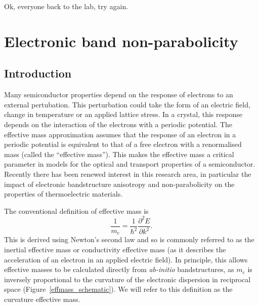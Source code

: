 \begin{savequote}[8cm]
Ok, everyone back to the lab, try again.
\end{savequote}

\chapter{\label{ch:4-effmass}Electronic band non-parabolicity}

\section{Introduction}

Many semiconductor properties depend on the response of electrons to an external pertubation.
This perturbation could take the form of an electric field, change in temperature or an applied lattice stress.  %
In a crystal, this response depends on the interaction of the electrons with a periodic potential. 
The effective mass approximation assumes that the response of an electron in a periodic potential is equivalent to that of a free electron with a renormalised mass (called the ``effective mass'').
This makes the effective mass a critical parameter in models for the optical and transport properties of a semiconductor.
Recently there has been renewed interest in this research area, in particular the impact of electronic bandstructure anisotropy and non-parabolicity on the properties of thermoelectric materials.\autocite{Gibbs2017,Mecholsky2014}

The conventional definition of effective mass is
\begin{equation} \label{curvature}
\frac{1}{m_\text{c}}= \frac{1}{\hbar^2}\frac{\partial^2E}{\partial k^2}.
\end{equation}
This is derived using Newton's second law\autocite{Ashcroft1976,Ariel2012} and so is commonly referred to as the inertial effective mass or conductivity effective mass (as it describes the acceleration of an electron in an applied electric field).
In principle, this allows effective masses to be calculated directly from \textit{ab-initio} bandstructures,
as $m_\text{c}$ is inversely proportional to the curvature of the electronic dispersion in reciprocal space (Figure\ \ref{effmass_schematic}). 
We will refer to this definition as the curvature effective mass.

